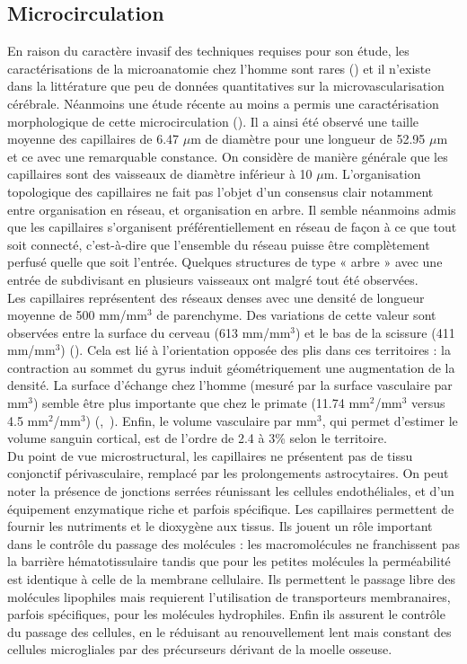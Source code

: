 \subsection{Microcirculation}
En raison du caractère invasif des techniques requises pour son étude, les caractérisations de la microanatomie chez l’homme sont rares (\cite{Brett2002}) et il n’existe dans la littérature que peu de données quantitatives sur la microvascularisation cérébrale. Néanmoins une étude récente au moins a permis une caractérisation morphologique de cette microcirculation (\cite{Lauwers2008}). Il a ainsi été observé une taille moyenne des capillaires de 6.47 $\mu$m de diamètre pour une longueur de 52.95 $\mu$m et ce avec une remarquable constance. On considère de manière générale que les capillaires sont des vaisseaux de diamètre inférieur à 10 $\mu$m. L’organisation topologique des capillaires ne fait pas l’objet d’un consensus clair notamment entre organisation en réseau, et organisation en arbre. Il semble néanmoins admis que les capillaires s’organisent préférentiellement en réseau de façon à ce que tout soit connecté, c’est-à-dire que l’ensemble du réseau puisse être complètement perfusé quelle que soit l’entrée. Quelques structures de type « arbre » avec une entrée de subdivisant en plusieurs vaisseaux ont malgré tout été observées.\\
Les capillaires représentent des réseaux denses avec une densité de longueur moyenne de 500 mm/mm$^3$ de parenchyme. Des variations de cette valeur sont observées entre la surface du cerveau (613 mm/mm$^3$) et le bas de la scissure (411 mm/mm$^3$)  (\cite{Lauwers2008}). Cela est lié à l’orientation opposée des plis dans ces territoires : la contraction au sommet du gyrus induit géométriquement une augmentation de la densité. La surface d’échange chez l’homme (mesuré par la surface vasculaire par mm$^3$) semble être plus importante que chez le primate (11.74 mm$^2$/mm$^3$ versus 4.5 mm$^2$/mm$^3$) (\cite{Lauwers2008},~\cite{Risser2007}). Enfin, le volume vasculaire par mm$^3$, qui permet d’estimer le volume sanguin cortical, est de l’ordre de 2.4 à 3\% selon le territoire.\\
Du point de vue microstructural, les capillaires ne présentent pas de tissu conjonctif périvasculaire, remplacé par les prolongements astrocytaires. On peut noter la présence de jonctions serrées réunissant les cellules endothéliales, et d’un équipement enzymatique riche et parfois spécifique. Les capillaires permettent de fournir les nutriments et le dioxygène aux tissus. Ils jouent un rôle important dans le contrôle du passage des molécules : les macromolécules ne franchissent pas la barrière hématotissulaire tandis que pour les petites molécules la perméabilité est identique à celle de la membrane cellulaire. Ils permettent le passage libre des molécules lipophiles mais requierent l’utilisation de transporteurs membranaires, parfois spécifiques, pour les molécules hydrophiles. Enfin ils assurent le contrôle du passage des cellules, en le réduisant au renouvellement lent mais constant des cellules microgliales par des précurseurs dérivant de la moelle osseuse.\\
